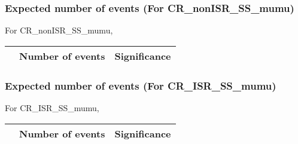 \begin{frame}
\frametitle{Expected number of events (For CR\_nonISR\_SS\_mumu)}
For CR\_nonISR\_SS\_mumu,\\
\vspace{5mm}
\begin{tabular}{|c|c|c|}
\hline
& Number of events & Significance \\
\hline

\end{tabular}
\end{frame}

\begin{frame}
\frametitle{Expected number of events (For CR\_ISR\_SS\_mumu)}
For CR\_ISR\_SS\_mumu,\\
\vspace{5mm}
\begin{tabular}{|c|c|c|}
\hline
& Number of events & Significance \\
\hline

\end{tabular}
\end{frame}

